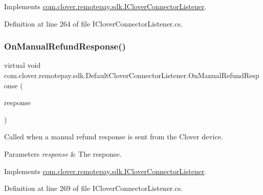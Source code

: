 Implements \hyperlink{interfacecom_1_1clover_1_1remotepay_1_1sdk_1_1_i_clover_connector_listener_a6c7bff0d9fe64dc624fb175ef33e5299}{com.\+clover.\+remotepay.\+sdk.\+I\+Clover\+Connector\+Listener}.



Definition at line 264 of file I\+Clover\+Connector\+Listener.\+cs.

\mbox{\label{classcom_1_1clover_1_1remotepay_1_1sdk_1_1_default_clover_connector_listener_a8294033c92e3c74aea2aac5e47c72873}} 
\subsubsection{\texorpdfstring{On\+Manual\+Refund\+Response()}{OnManualRefundResponse()}}
{\footnotesize\ttfamily virtual void com.\+clover.\+remotepay.\+sdk.\+Default\+Clover\+Connector\+Listener.\+On\+Manual\+Refund\+Response (\begin{DoxyParamCaption}\item[{\hyperlink{classcom_1_1clover_1_1remotepay_1_1sdk_1_1_manual_refund_response}{Manual\+Refund\+Response}}]{response }\end{DoxyParamCaption})\hspace{0.3cm}{\ttfamily [virtual]}}



Called when a manual refund response is sent from the Clover device. 


\begin{DoxyParams}{Parameters}
{\em response} & The response.\\
\hline
\end{DoxyParams}


Implements \hyperlink{interfacecom_1_1clover_1_1remotepay_1_1sdk_1_1_i_clover_connector_listener_a816b762344c31db77125abe68fe2c125}{com.\+clover.\+remotepay.\+sdk.\+I\+Clover\+Connector\+Listener}.



Definition at line 269 of file I\+Clover\+Connector\+Listener.\+cs.

